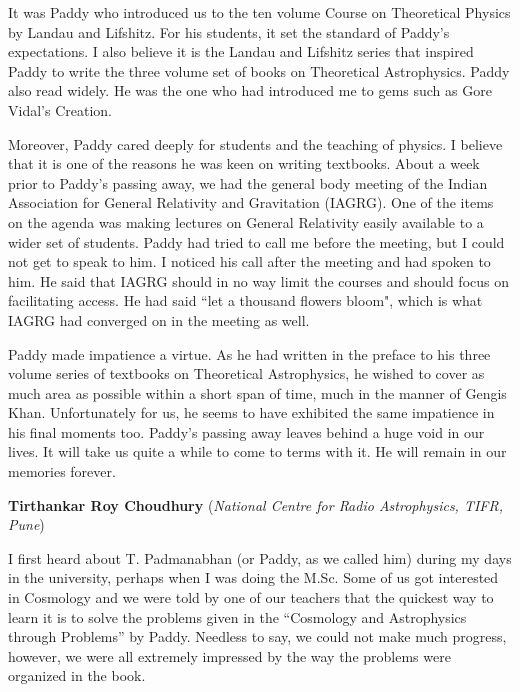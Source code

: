 \documentclass[prd, preprint, longbibliography, 11pt]{revtex4-1}
\begin{document}
It was Paddy who introduced us to the ten volume Course on Theoretical Physics 
by Landau and Lifshitz. 
For his students, it set the standard of Paddy's expectations. 
I also believe it is the Landau and Lifshitz series that inspired Paddy 
to write  the three volume set of books on Theoretical Astrophysics.
Paddy also read widely. 
He was the one who had introduced me to gems such as Gore Vidal's Creation.

Moreover, Paddy cared deeply for students and the teaching of physics. 
I believe that it is one of the reasons he was keen on writing textbooks. 
About a week prior to Paddy's passing away, we had the general body meeting 
of the Indian Association for General Relativity and Gravitation (IAGRG). 
One of the items on the agenda was making lectures on General Relativity 
easily available to a wider set of students. 
Paddy had tried to call me before the meeting, but I could not get to speak 
to him. 
I noticed his call after the meeting and had spoken to him. 
He said that IAGRG should in no way limit the courses and should focus on 
facilitating access. 
He had said ``let a thousand flowers bloom", which is what IAGRG had converged 
on in the meeting as well.

Paddy made impatience a virtue. 
As he had written in the preface to his three volume series of textbooks on 
Theoretical Astrophysics, he wished to cover as much area as possible within
a short span of time, much in the manner of Gengis Khan. 
Unfortunately for us, he seems to have exhibited the same impatience in his 
final moments too.
Paddy's passing away leaves behind a huge void in our lives. 
It will take us quite a while to come to terms with it. 
He will remain in our memories forever.

\bigskip

\bigskip

\newpage

\centerline{{\bf Tirthankar Roy Choudhury} ({\it National Centre for Radio Astrophysics, TIFR, Pune})}

\medskip

\noindent I first heard about T. Padmanabhan (or Paddy, as we called him) during my days in the university, perhaps when I was doing the M.Sc. Some of us got interested in Cosmology and we were told by one of our teachers that the quickest way to learn it is to solve the problems given in the “Cosmology and Astrophysics through Problems” by Paddy. Needless to say, we could not make much progress, however, we were all extremely impressed by the way the problems were organized in the book.
\end{document}
